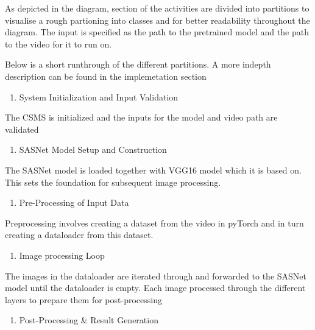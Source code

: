 \documentclass[
]{article}
\providecommand{\tightlist}{%
  \setlength{\itemsep}{0pt}\setlength{\parskip}{0pt}}\usepackage{longtable,booktabs,array}
\begin{document}
As depicted in the diagram, section of the activities are divided into
partitions to visualise a rough partioning into classes and for better
readability throughout the diagram. The input is specified as the path
to the pretrained model and the path to the video for it to run on.

Below is a short runthrough of the different partitions. A more indepth
description can be found in the implemetation section

\begin{enumerate}
\def\labelenumi{\arabic{enumi}.}
\tightlist
\item
  System Initialization and Input Validation
\end{enumerate}

The CSMS is initialized and the inputs for the model and video path are
validated

\begin{enumerate}
\def\labelenumi{\arabic{enumi}.}
\setcounter{enumi}{1}
\tightlist
\item
  SASNet Model Setup and Construction
\end{enumerate}

The SASNet model is loaded together with VGG16 model which it is based
on. This sets the foundation for subsequent image processing.

\begin{enumerate}
\def\labelenumi{\arabic{enumi}.}
\setcounter{enumi}{2}
\tightlist
\item
  Pre-Processing of Input Data
\end{enumerate}

Preprocessing involves creating a dataset from the video in pyTorch and
in turn creating a dataloader from this dataset.

\begin{enumerate}
\def\labelenumi{\arabic{enumi}.}
\setcounter{enumi}{3}
\tightlist
\item
  Image processing Loop
\end{enumerate}

The images in the dataloader are iterated through and forwarded to the
SASNet model until the dataloader is empty. Each image processed through
the different layers to prepare them for post-processing

\begin{enumerate}
\def\labelenumi{\arabic{enumi}.}
\setcounter{enumi}{4}
\tightlist
\item
  Post-Processing \& Result Generation
\end{enumerate}
\end{document}

